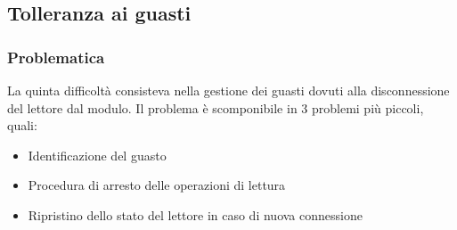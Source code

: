 \subsection{Tolleranza ai guasti}
\subsubsection*{Problematica}
La quinta difficoltà consisteva nella gestione dei guasti dovuti alla disconnessione del lettore dal modulo.
Il problema è scomponibile in 3 problemi più piccoli, quali:
\begin{itemize}
    \item Identificazione del guasto
    \item Procedura di arresto delle operazioni di lettura
    \item Ripristino dello stato del lettore in caso di nuova connessione
\end{itemize}

